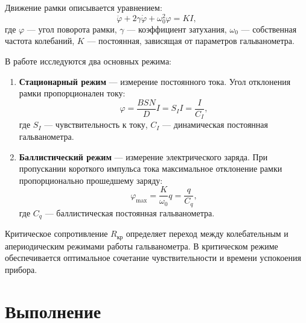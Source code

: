 \documentclass[a4paper]{article}
\begin{document}
Движение рамки описывается уравнением:
\[
\ddot{\varphi} + 2\gamma \dot{\varphi} + \omega_0^2 \varphi = KI,
\]
где $\varphi$ --- угол поворота рамки, $\gamma$ --- коэффициент затухания, $\omega_0$ --- собственная частота колебаний, $K$ --- постоянная, зависящая от параметров гальванометра.

В работе исследуются два основных режима:
\begin{enumerate}
    \item \textbf{Стационарный режим} --- измерение постоянного тока. Угол отклонения рамки пропорционален току:
    \[
    \varphi = \frac{BSN}{D} I = S_I I = \frac{I}{C_I},
    \]
    где $S_I$ --- чувствительность к току, $C_I$ --- динамическая постоянная гальванометра.
    
    \item \textbf{Баллистический режим} --- измерение электрического заряда. При пропускании короткого импульса тока максимальное отклонение рамки пропорционально прошедшему заряду:
    \[
    \varphi_{\text{max}} = \frac{K}{\omega_0} q = \frac{q}{C_q},
    \]
    где $C_q$ --- баллистическая постоянная гальванометра.
\end{enumerate}

Критическое сопротивление $R_{\text{кр}}$ определяет переход между колебательным и апериодическим режимами работы гальванометра. В критическом режиме обеспечивается оптимальное сочетание чувствительности и времени успокоения прибора.



\section{Выполнение}
\end{document}
